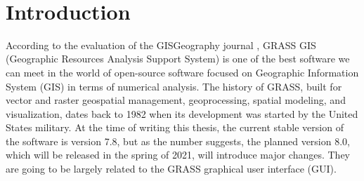 \documentclass[a4paper,10pt,twoside]{article}
\begin{document}

\newpage ~ \newpage
\thispagestyle{empty}


\newpage

\tableofcontents %
\newpage
\listoffigures %

\thispagestyle{empty}
\newcommand{\obrazek}[1]{(viz obr. \ref{#1})} %

\newpage
\pagestyle{fancy}


\renewcommand{\sectionmark}[1]{\markright{\ #1}}

\fancyhf{} %
\renewcommand{\headrulewidth}{0.4pt} %
\renewcommand{\footrulewidth}{0.4pt}  %
\addtolength{\voffset}{-0.4cm}

\fancyhead[RE, RO]{\nouppercase{\rightmark}}
   
\fancyfoot[RO, LE]{{\textsc{\small \thepage}}}

\fancypagestyle{plain}{
  \fancyhead{} %
  \renewcommand{\headrulewidth}{0pt} %
}


\newpage
\vspace*{-1cm}
\pagestyle{fancy}
\section{Introduction}
\large
\setcounter{page}{17}  %

\noindent According to the evaluation of the GISGeography journal
\cite{gisgeography}, GRASS GIS (Geographic Resources Analysis Support
System) is one of the best software we can meet in the world of
open-source software focused on Geographic Information System (GIS) in
terms of numerical analysis. The history of GRASS, built for vector
and raster geospatial management, geoprocessing, spatial modeling, and
visualization, dates back to 1982 when its development was started by
the United States military. At the time of writing this thesis, the
current stable version of the software is version 7.8, but as the
number suggests, the planned version 8.0, which will be released in
the spring of 2021, will introduce major changes. They are going to be
largely related to the GRASS graphical user interface (GUI).
\end{document}
